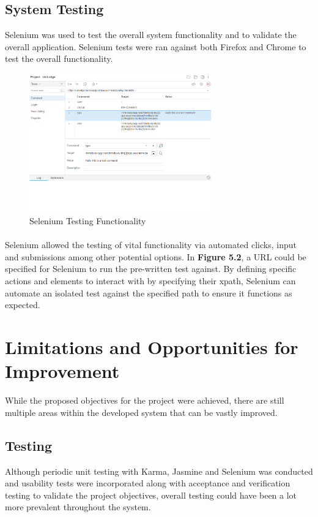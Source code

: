 \subsection{System Testing}
Selenium was used to test the overall system functionality and to validate the overall application. Selenium tests were ran against both Firefox and Chrome to test the overall functionality.

\begin{figure}[H]
	\caption{Selenium Testing Functionality}
	\label{image:selenium}
	\centering
	\includegraphics[width=0.70\textwidth]{images/selenium.png}
\end{figure}	

\paragraph{}
Selenium allowed the testing of vital functionality via automated clicks, input and submissions among other potential options. In \textbf{Figure 5.2}, a URL could be specified for Selenium to run the pre-written test against. By defining specific actions and elements to interact with by specifying their xpath, Selenium can automate an isolated test against the specified path to ensure it functions as expected.

\section{Limitations and Opportunities for Improvement}
While the proposed objectives for the project were achieved, there are still multiple areas within the developed system that can be vastly improved.

\subsection{Testing}
Although periodic unit testing with Karma, Jasmine and Selenium was conducted and usability tests were incorporated along with acceptance and verification testing to validate the project objectives, overall testing could have been a lot more prevalent throughout the system.


